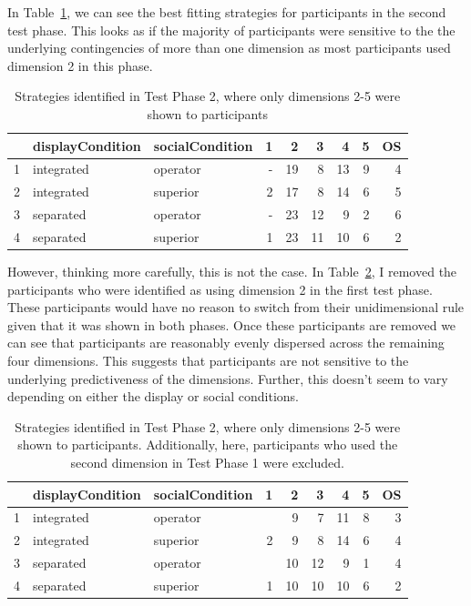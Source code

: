 \documentclass[doc, a4paper, apacite]{apa6}
\begin{document}
In Table~\ref{table:strategiesTest2}, we can see the best fitting strategies for participants in the second test phase. 
This looks as if the majority of participants were sensitive to the the underlying contingencies of more than one dimension as most participants used dimension 2 in this phase. 

\begin{table}[b]
	\centering
	\caption{Strategies identified in Test Phase 2, where only dimensions 2-5 were shown to participants}
	\label{table:strategiesTest2}
	\begin{tabular}{rllrrrrrr}
	  \hline
	 & displayCondition & socialCondition & 1 & 2 & 3 & 4 & 5 & OS\\ 
	  \hline
	  1 & integrated & operator & - &  19 &   8 &  13 &   9 &   4 \\ 
	  2 & integrated & superior &   2 &  17 &   8 &  14 &   6 &   5 \\ 
	  3 & separated & operator & - &  23 &  12 &   9 &   2 &   6 \\ 
	  4 & separated & superior &   1 &  23 &  11 &  10 &   6 &   2 \\ 
	   \hline
	\end{tabular}
\end{table}

However, thinking more carefully, this is not the case. 
In Table~\ref{table:strategiesTest2withoutDim2}, I removed the participants who were identified as using dimension 2 in the first test phase. 
These participants would have no reason to switch from their unidimensional rule given that it was shown in both phases. 
Once these participants are removed we can see that participants are reasonably evenly dispersed across the remaining four dimensions. 
This suggests that participants are not sensitive to the underlying predictiveness of the dimensions. 
Further, this doesn't seem to vary depending on either the display or social conditions. 

\begin{table}
	\caption{Strategies identified in Test Phase 2, where only dimensions 2-5 were shown to participants. Additionally, here, participants who used the second dimension in Test Phase 1 were excluded.}
	\label{table:strategiesTest2withoutDim2}
	\centering
	\begin{tabular}{rllrrrrrr}
	  \hline
	 & displayCondition & socialCondition & 1 & 2 & 3 & 4 & 5 & OS\\ 
	  \hline
	  1 & integrated & operator &  &   9 &   7 &  11 &   8 &   3 \\ 
	  2 & integrated & superior &   2 &   9 &   8 &  14 &   6 &   4 \\ 
	  3 & separated & operator &  &  10 &  12 &   9 &   1 &   4 \\ 
	  4 & separated & superior &   1 &  10 &  10 &  10 &   6 &   2 \\ 
	   \hline
	\end{tabular}
\end{table}
\end{document}
